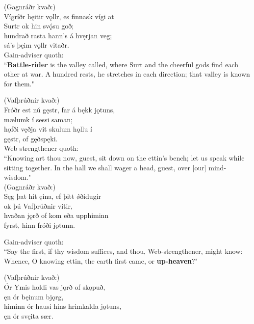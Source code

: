 (Gagnráðr kvað:) \\%
\bva Vígríðr hęitir vǫllr, \hld es finnask vígi at \\%
Surtr ok hin svǫ́su goð; \\%
hundrað rasta \hld hann's á hvęrjan veg; \\%
sá's þęim vǫllr vitaðr.\\%

\bvb Gain-adviser quoth: \\ “\textbf{Battle-rider} is the valley called, where Surt and the cheerful gods find each other at war. A hundred rests\footnotemark[30], he stretches in each direction; that valley is known for them.\footnotemark[31]" \\

(Vafþrúðnir kvað:) \\%
\bva Fróðr est nú gęstr, \hld far á bękk jǫtuns, \\%
mælumk í sessi saman; \\%
hǫfði vęðja \hld vit skulum hǫllu í \\%
gęstr, of gęðspęki.\\%

\bvb Web-strengthener quoth: \\ “Knowing art thou now, guest, sit down on the ettin's bench; let us speak while sitting together. In the hall we shall wager a head, guest, over [our] mind-wisdom." \\

(Gagnráðr kvað:) \\%
\bva Sęg þat hit ęina, \hld ef þitt ǿði\footnotemark[10] dugir \\%
ok þú Vafþrúðnir vitir, \\%
hvaðan jǫrð of kom \hld eða upphiminn \\%
fyrst, hinn fróði jǫtunn.\\%

\bvb Gain-adviser quoth: \\ “Say the first\footnotemark[32], if thy wisdom suffices, and thou, Web-strengthener, might know: Whence, O knowing ettin, the earth first came, or \textbf{up-heaven}?" \\

(Vafþrúðnir kvað:) \\%
\bva Ór Ymis holdi \hld vas jǫrð of skǫpuð, \\%
ęn ór bęinum bjǫrg, \\%
himinn ór hausi \hld hins hrimkalda jǫtuns, \\%
ęn ór svęita sær.\\%

